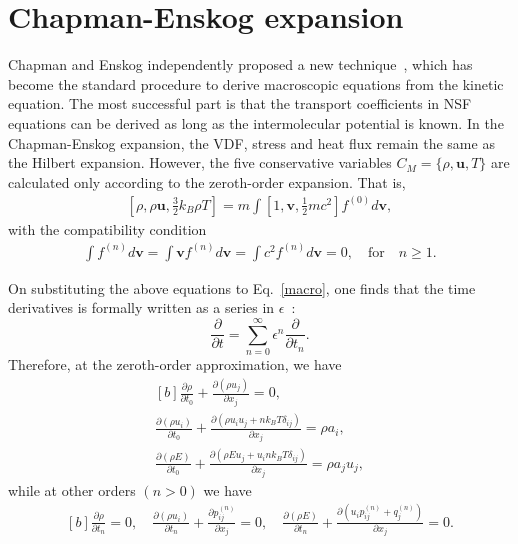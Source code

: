 \section{Chapman-Enskog expansion}\label{Champan_Enskog_expansion}

Chapman and Enskog independently proposed a new technique~\cite{Chapman1916,Enskog1917}, which has become the standard procedure to derive macroscopic equations from the kinetic equation. The most successful part is that the transport coefficients in NSF equations can be derived as long as the intermolecular potential is known. In the Chapman-Enskog expansion, the VDF, stress and heat flux remain the same as the Hilbert expansion. However, the five conservative variables $C_M=\{\rho,\bm{u}, T\}$  are calculated only according to the zeroth-order expansion. That is, 
\begin{eqnarray}\label{density_hilbert}
\left[\rho,\rho\bm{u},\frac{3}{2}k_B\rho{}T\right]=
m\int{}\left[1,\bm{v},\frac{1}{2}mc^2\right]f^{(0)}d\bm{v},  
\end{eqnarray}
with the compatibility condition
\begin{eqnarray} \label{compatibility}
\int{}f^{(n)}d\bm{v}=\int{}\bm{v}f^{(n)}d\bm{v}=\int{}c^2f^{(n)}d\bm{v}=0, \quad \text{for} \quad n\ge1.
\end{eqnarray}


On substituting the above equations to Eq.~\eqref{macro}, one finds that the time derivatives is formally written as a series in $\epsilon$~\cite{henning}:
\begin{equation}\label{fast_slow_time}
\frac{\partial}{\partial{} t}=\sum_{n=0}^\infty \epsilon^n \frac{\partial}{\partial{} t_n}.
\end{equation}
Therefore, at the zeroth-order approximation, we have
\begin{equation}\label{eq123_zerothOrder}
\begin{aligned}[b]
\frac{\partial \rho}{\partial t_0}+\frac{\partial(\rho{}u_j) }{\partial x_j}=0, \\
\frac{\partial (\rho{u_i})}{\partial t_0}+\frac{\partial (\rho{}u_iu_j+nk_BT\delta_{ij})}{\partial x_j}= \rho{}a_i,\\
\frac{\partial \left(\rho{}E\right)}{\partial t_0}+\frac{\partial \left(\rho{}{E}u_j+u_ink_BT\delta_{ij}\right)}{\partial x_j}=\rho{}a_ju_j,
\end{aligned}
\end{equation} 
while at other orders $(n>0)$ we have
\begin{equation}\label{eq123_HighOrder}
\begin{aligned}[b]
\frac{\partial \rho}{\partial t_n}=0, \quad
\frac{\partial (\rho{u_i})}{\partial t_n}+\frac{\partial p^{(n)}_{ij}}{\partial x_j}= 0,\quad
\frac{\partial \left(\rho{}E\right)}{\partial t_n}+\frac{\partial \left(u_ip^{(n)}_{ij}+q^{(n)}_j\right)}{\partial x_j}=0.
\end{aligned}
\end{equation} 

